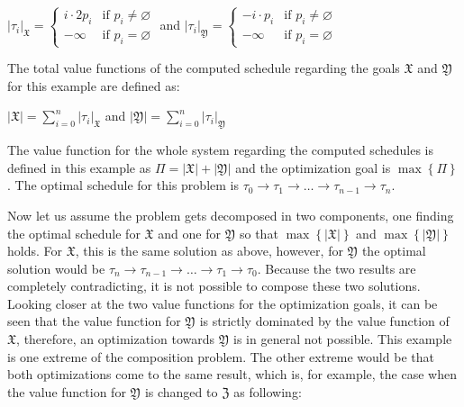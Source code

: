 \begin{center}
	\(|\tau_i|_\mathfrak{X} = \left\{ \begin{array}{ll}
		i \cdot 2p_i & \mbox{if } p_i \neq \varnothing \\
		- \infty     & \mbox{if } p_i = \varnothing
	\end{array}\right.\)
	\hspace{1cm} and \hspace{1cm}
	\(|\tau_i|_\mathfrak{Y} = \left\{ \begin{array}{ll}
		-i \cdot p_i & \mbox{if } p_i \neq \varnothing \\
		- \infty     & \mbox{if } p_i = \varnothing
	\end{array}\right.\)
\end{center}

The total value functions of the computed schedule regarding the goals \(\mathfrak{X}\) and \(\mathfrak{Y}\) for this example are defined as:

\begin{center}
	\(|\mathfrak{X}| = \displaystyle\sum_{i=0}^n |\tau_i|_\mathfrak{X}\) \hspace{1cm} and \hspace{1cm} \(|\mathfrak{Y}| = \displaystyle\sum_{i=0}^n |\tau_i|_\mathfrak{Y}\)
\end{center}

The value function for the whole system regarding the computed schedules is defined in this example as \(\Pi = |\mathfrak{X}| + |\mathfrak{Y}|\) and the optimization goal is \(\max\left\{ \Pi \right\}\). The optimal schedule for this problem is \(\tau_0 \rightarrow \tau_1 \rightarrow \ldots \rightarrow \tau_{n-1} \rightarrow \tau_n\).

Now let us assume the problem gets decomposed in two components, one finding the optimal schedule for \(\mathfrak{X}\) and one for \(\mathfrak{Y}\) so that \(\max\left\{ |\mathfrak{X}| \right\}\) and \(\max\left\{ |\mathfrak{Y}| \right\}\) holds. For \(\mathfrak{X}\), this is the same solution as above, however, for \(\mathfrak{Y}\) the optimal solution would be \(\tau_n \rightarrow \tau_{n-1} \rightarrow \ldots \rightarrow \tau_1 \rightarrow \tau_0\).  Because the two results are completely contradicting, it is not possible to compose these two solutions. Looking closer at the two value functions for the optimization goals, it can be seen that the value function for \(\mathfrak{Y}\) is strictly dominated by the value function of \(\mathfrak{X}\), therefore, an optimization towards \(\mathfrak{Y}\) is in general not possible. This example is one extreme of the composition problem. The other extreme would be that both optimizations come to the same result, which is, for example, the case when the value function for \(\mathfrak{Y}\) is changed to \(\mathfrak{Z}\) as following:

